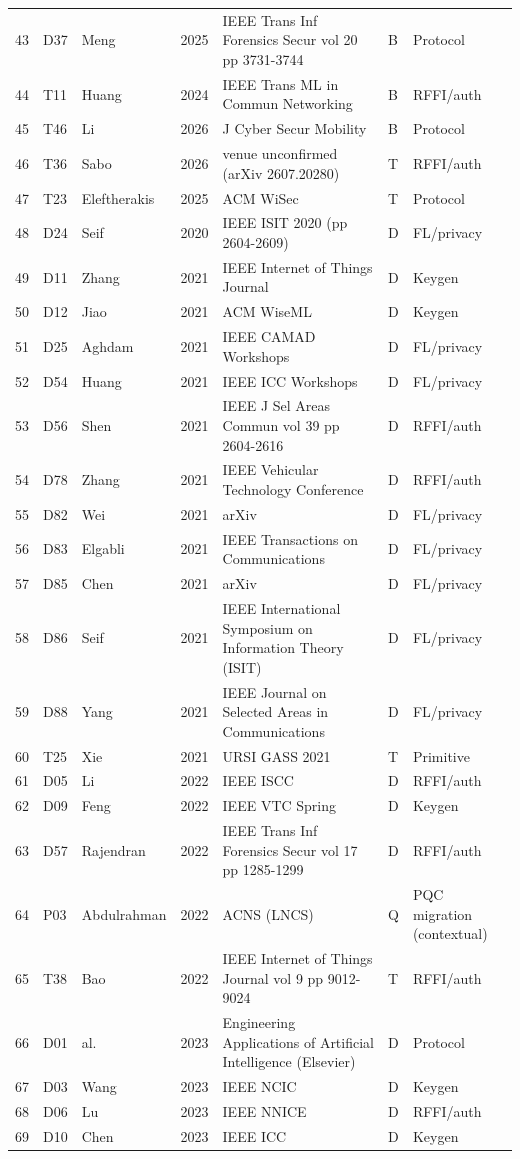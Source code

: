 \documentclass[10.5pt,compsoc,winfonts]{ICN}
\begin{document}
\begin{table}[p]
\begin{tabular}{@{}lllll>{\raggedright\arraybackslash}p{3.3cm}>{\raggedright\arraybackslash}p{1.9cm}@{}}
43 & D37 & Meng & 2025 & IEEE Trans Inf Forensics Secur vol 20 pp 3731-3744 & B & Protocol \\
44 & T11 & Huang & 2024 & IEEE Trans ML in Commun Networking & B & RFFI/auth \\
45 & T46 & Li & 2026 & J Cyber Secur Mobility & B & Protocol \\
46 & T36 & Sabo & 2026 & venue unconfirmed (arXiv 2607.20280) & T & RFFI/auth \\
47 & T23 & Eleftherakis & 2025 & ACM WiSec & T & Protocol \\
48 & D24 & Seif & 2020 & IEEE ISIT 2020 (pp 2604-2609) & D & FL/privacy \\
49 & D11 & Zhang & 2021 & IEEE Internet of Things Journal & D & Keygen \\
50 & D12 & Jiao & 2021 & ACM WiseML & D & Keygen \\
51 & D25 & Aghdam & 2021 & IEEE CAMAD Workshops & D & FL/privacy \\
52 & D54 & Huang & 2021 & IEEE ICC Workshops & D & FL/privacy \\
53 & D56 & Shen & 2021 & IEEE J Sel Areas Commun vol 39 pp 2604-2616 & D & RFFI/auth \\
54 & D78 & Zhang & 2021 & IEEE Vehicular Technology Conference & D & RFFI/auth \\
55 & D82 & Wei & 2021 & arXiv & D & FL/privacy \\
56 & D83 & Elgabli & 2021 & IEEE Transactions on Communications & D & FL/privacy \\
57 & D85 & Chen & 2021 & arXiv & D & FL/privacy \\
58 & D86 & Seif & 2021 & IEEE International Symposium on Information Theory (ISIT) & D & FL/privacy \\
59 & D88 & Yang & 2021 & IEEE Journal on Selected Areas in Communications & D & FL/privacy \\
60 & T25 & Xie & 2021 & URSI GASS 2021 & T & Primitive \\
61 & D05 & Li & 2022 & IEEE ISCC & D & RFFI/auth \\
62 & D09 & Feng & 2022 & IEEE VTC Spring & D & Keygen \\
63 & D57 & Rajendran & 2022 & IEEE Trans Inf Forensics Secur vol 17 pp 1285-1299 & D & RFFI/auth \\
64 & P03 & Abdulrahman & 2022 & ACNS (LNCS) & Q & PQC migration (contextual) \\
65 & T38 & Bao & 2022 & IEEE Internet of Things Journal vol 9 pp 9012-9024 & T & RFFI/auth \\
66 & D01 & al. & 2023 & Engineering Applications of Artificial Intelligence (Elsevier) & D & Protocol \\
67 & D03 & Wang & 2023 & IEEE NCIC & D & Keygen \\
68 & D06 & Lu & 2023 & IEEE NNICE & D & RFFI/auth \\
69 & D10 & Chen & 2023 & IEEE ICC & D & Keygen \\\bottomrule
\end{tabular}
\end{table}
\end{document}
